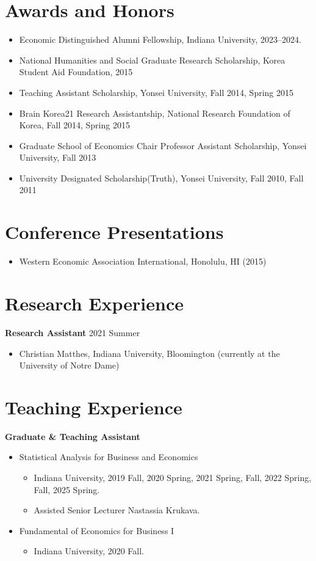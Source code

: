 \documentclass[11pt,a4paper]{article}
\begin{document}
\section*{Awards and Honors}
\begin{itemize}[leftmargin=*]   
\item Economic Distinguished Alumni Fellowship, Indiana University, 2023--2024.    
\item National Humanities and Social Graduate Research Scholarship, Korea Student Aid Foundation, 2015
\item Teaching Assistant Scholarship, Yonsei University, Fall 2014, Spring 2015
\item Brain Korea21 Research Assistantship, National Research Foundation of Korea, Fall 2014, Spring 2015
\item Graduate School of Economics Chair Professor Assistant Scholarship, Yonsei University, Fall 2013
\item University Designated Scholarship(Truth), Yonsei University, Fall 2010, Fall 2011
\end{itemize}

\section*{Conference Presentations}
\begin{itemize}[leftmargin=*]
    \item Western Economic Association International, Honolulu, HI (2015)    
\end{itemize}

\section*{Research Experience}
\textbf{Research Assistant} \hfill 2021 Summer
\begin{itemize}[leftmargin=*]
    \item Christian Matthes, Indiana University, Bloomington (currently at the University of Notre Dame)    
\end{itemize}


\section*{Teaching Experience}
\textbf{Graduate \& Teaching Assistant} 
\begin{itemize}[leftmargin=*]   
\item Statistical Analysis for Business and Economics
    \begin{itemize}[leftmargin=*]
        \item Indiana University, 2019 Fall, 2020 Spring, 2021 Spring, Fall, 2022 Spring, Fall, 2025 Spring.
        \item Assisted Senior Lecturer Nastassia Krukava.
    \end{itemize}    
\item Fundamental of Economics for Business I
    \begin{itemize}[leftmargin=*]
        \item Indiana University, 2020 Fall.
    \end{itemize}
\end{itemize}
\end{document}
